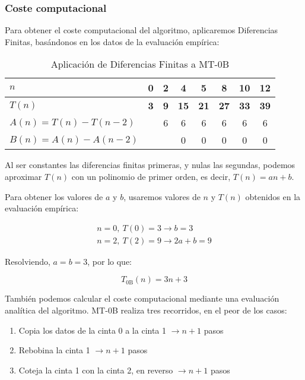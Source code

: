 \subsubsection*{Coste computacional}
Para obtener el coste computacional del algoritmo, aplicaremos Diferencias Finitas, basándonos en los datos de la evaluación empírica:

\begin{table}[H]
    \centering
    \begin{tabular}{|l|c|c|c|c|c|c|c|}
        \hline
        $n$ & \textbf{0} & \textbf{2} & \textbf{4} & \textbf{5} & \textbf{8} & \textbf{10} & \textbf{12} \\ \hline
        $T(n)$ & \textbf{3} & \textbf{9} & \textbf{15} & \textbf{21} & \textbf{27} & \textbf{33} & \textbf{39} \\ \hline
        \hline
        $A(n) = T(n) - T(n-2)$ &    &  6 &  6 &  6 &  6 &  6 &  6 \\ \hline
        $B(n) = A(n) - A(n-2)$ &    &    & 0 &  0 &  0 &  0 &  0 \\ \hline
    \end{tabular}
    \label{tab:0B}
    \caption{Aplicación de Diferencias Finitas a MT-0B}
\end{table}

Al ser constantes las diferencias finitas primeras, y nulas las segundas, podemos aproximar $T(n)$ con un polinomio de primer orden, es decir, $T(n) = an + b$.\medskip

Para obtener los valores de $a$ y $b$, usaremos valores de $n$ y $T(n)$ obtenidos en la evaluación empírica:

\begin{subequations}
    \begin{gather}
        n = 0,\ T(0) = 3 \rightarrow b = 3 \\
        n = 2,\ T(2) = 9 \rightarrow 2a + b = 9
    \end{gather}
\end{subequations}

Resolviendo, $a=b=3$, por lo que:

\begin{equation}
    T_{\mathrm{0B}}(n) = 3n + 3
    \label{eq:Tn0B}
\end{equation}

También podemos calcular el coste computacional mediante una evaluación analítica del algoritmo. MT-0B realiza tres recorridos, en el peor de los casos:
\begin{enumerate}
    \item Copia los datos de la cinta 0 a la cinta 1 $\rightarrow n+1$ pasos
    \item Rebobina la cinta 1 $\rightarrow n+1$ pasos
    \item Coteja la cinta 1 con la cinta 2, en reverso $\rightarrow n+1$ pasos
\end{enumerate}

